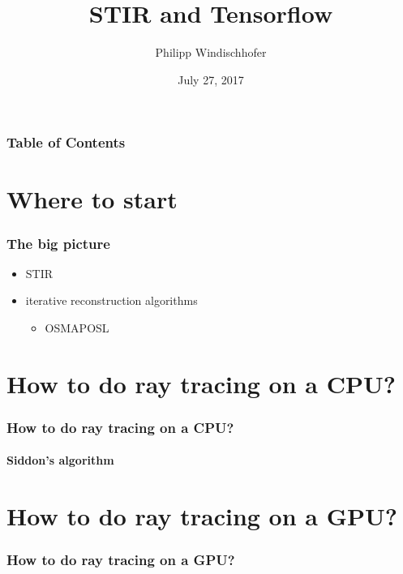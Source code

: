 \documentclass{beamer}
\title{STIR and Tensorflow}
\author{Philipp Windischhofer}
\date{July 27, 2017}
\begin{document}
 
\frame{\titlepage}

\begin{frame}
\frametitle{Table of Contents}
\tableofcontents
\end{frame}

\section{Where to start}
\begin{frame}
  \frametitle{The big picture}
  \begin{itemize}
    \item STIR
    \item iterative reconstruction algorithms
      \begin{itemize}
        \item OSMAPOSL
      \end{itemize}
  \end{itemize}
\end{frame}

\section{How to do ray tracing on a CPU?}
\begin{frame}
  \frametitle{How to do ray tracing on a CPU?}
  \framesubtitle{Siddon's algorithm}
\end{frame}

\section{How to do ray tracing on a GPU?}
\begin{frame}
  \frametitle{How to do ray tracing on a GPU?}
  
\end{frame}
\end{document}

